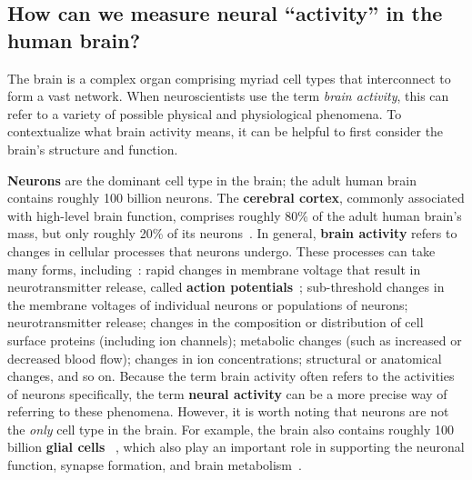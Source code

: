 \documentclass{llmxive}
\begin{document}
\subsection{How can we measure neural ``activity'' in the human
  brain? \label{sec:activity}}

The brain is a complex organ comprising myriad cell types that
interconnect to form a vast network.  When neuroscientists use the term
\textit{brain activity}, this can refer to a variety of possible
physical and physiological phenomena.  To contextualize what brain
activity means, it can be helpful to first consider the brain's structure
and function.

\textbf{Neurons} are the dominant cell type in the brain; the adult
human brain contains roughly 100 billion neurons.  The
\textbf{cerebral cortex}, commonly associated with high-level brain
function, comprises roughly 80\% of the adult human brain's mass, but
only roughly 20\% of its neurons~\citep{Herc09}.  In general,
\textbf{brain activity} refers to changes in cellular processes that
neurons undergo.  These processes can take many forms,
including~\citep{KandEtal00}: rapid changes in membrane voltage that
result in neurotransmitter release, called \textbf{action
  potentials}~\citep{HodgHuxl52}; sub-threshold changes in the
membrane voltages of individual neurons or populations of neurons;
neurotransmitter release; changes in the composition or distribution
of cell surface proteins (including ion channels); metabolic changes
(such as increased or decreased blood flow); changes in ion
concentrations; structural or anatomical changes, and so on.  Because
the term brain activity often refers to the activities of neurons
specifically, the term \textbf{neural activity} can be a more precise
way of referring to these phenomena.  However, it is worth noting that
neurons are not the \textit{only} cell type in the brain.  For
example, the brain also contains roughly 100 billion \textbf{glial
  cells}~\citep{AzevEtal09, MotaHerc14} , which also play an important
role in supporting the neuronal function, synapse formation, and brain
metabolism~\cite{Barr08}.
\end{document}
